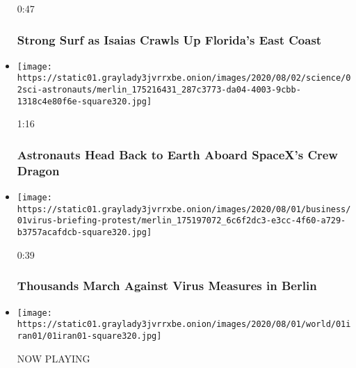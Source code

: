 \begin{itemize}
  0:47

  \hypertarget{strong-surf-as-isaias-crawls-up-floridas-east-coast}{%
  \subsubsection{Strong Surf as Isaias Crawls Up Florida's East
  Coast}\label{strong-surf-as-isaias-crawls-up-floridas-east-coast}}
\item
  \href{https://www.nytimes3xbfgragh.onion/video/us/100000007268936/spacex-departs-international-space-station.html?action=click\&module=video-series-bar\&region=header\&pgtype=Article\&playlistId=video/latest-video}{}

  \texttt{[image: https://static01.graylady3jvrrxbe.onion/images/2020/08/02/science/02sci-astronauts/merlin\_175216431\_287c3773-da04-4003-9cbb-1318c4e80f6e-square320.jpg]}

  1:16

  \hypertarget{astronauts-head-back-to-earth-aboard-spacexs-crew-dragon}{%
  \subsubsection{Astronauts Head Back to Earth Aboard SpaceX's Crew
  Dragon}\label{astronauts-head-back-to-earth-aboard-spacexs-crew-dragon}}
\item
  \href{https://www.nytimes3xbfgragh.onion/video/world/europe/100000007268465/coronavirus-protest-germany.html?action=click\&module=video-series-bar\&region=header\&pgtype=Article\&playlistId=video/latest-video}{}

  \texttt{[image: https://static01.graylady3jvrrxbe.onion/images/2020/08/01/business/01virus-briefing-protest/merlin\_175197072\_6c6f2dc3-e3cc-4f60-a729-b3757acafdcb-square320.jpg]}

  0:39

  \hypertarget{thousands-march-against-virus-measures-in-berlin}{%
  \subsubsection{Thousands March Against Virus Measures in
  Berlin}\label{thousands-march-against-virus-measures-in-berlin}}
\item
  \texttt{[image: https://static01.graylady3jvrrxbe.onion/images/2020/08/01/world/01iran01/01iran01-square320.jpg]}

  NOW PLAYING

  \hypertarget{iran-wont-negotiate-with-us-supreme-leader-says-1}{%
}
\end{itemize}
